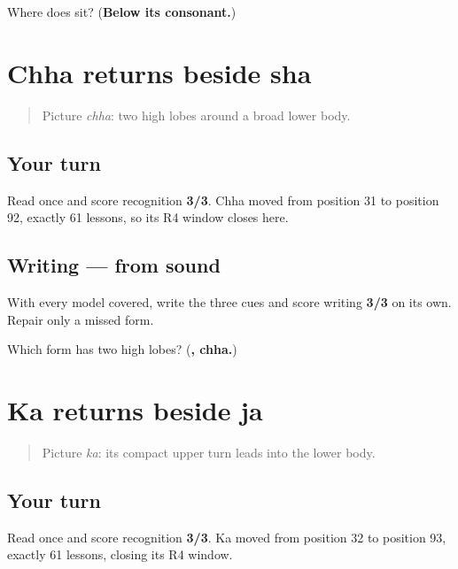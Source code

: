 \begin{tcolorbox}[breakable,colback=teal!4,colframe=teal!35!black,title={Before you move on}]
Where does \textbf{} sit? (\textbf{Below its consonant.})
\end{tcolorbox}
\section[chha — sha]{Chha returns beside sha}

\label{lesson:GU-R15-chha-r4}



\begin{quote}
Picture \emph{chha}: two high lobes around a broad lower body.
\end{quote}

\subsection*{Your turn}
Read \textbf{  } once and score recognition \textbf{3/3}. Chha moved from position 31 to position 92, exactly 61 lessons, so its R4 window closes here.

\subsection*{Writing — from sound}
With every model covered, write the three cues and score writing \textbf{3/3} on its own. Repair only a missed form.

\begin{tcolorbox}[breakable,colback=teal!4,colframe=teal!35!black,title={Before you move on}]
Which form has two high lobes? (\textbf{, chha.})
\end{tcolorbox}
\section[ka — ja]{Ka returns beside ja}

\label{lesson:GU-R15-ka-r4}



\begin{quote}
Picture \emph{ka}: its compact upper turn leads into the lower body.
\end{quote}

\subsection*{Your turn}
Read \textbf{  } once and score recognition \textbf{3/3}. Ka moved from position 32 to position 93, exactly 61 lessons, closing its R4 window.

